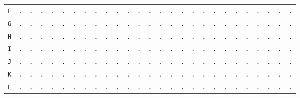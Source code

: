 \begin{figure}[H]
\begin{center}
{\begin{tabular}{c|cccccccccccccccccccccccccc}
				\texttt{F} & \texttt{.} & \texttt{.} & \texttt{.} & \texttt{.} & \texttt{.} & \texttt{.} & \texttt{.} & \texttt{.} & \texttt{.} & \texttt{.} & \texttt{.} & \texttt{.} & \texttt{.} & \texttt{.} & \texttt{.} & \texttt{.} & \texttt{.} & \texttt{.} & \texttt{.} & \texttt{.} & \texttt{.} & \texttt{.} & \texttt{.} & \texttt{.} & \texttt{.} & \texttt{.} \\
				\texttt{G} & \texttt{.} & \texttt{.} & \texttt{.} & \texttt{.} & \texttt{.} & \texttt{.} & \texttt{.} & \texttt{.} & \texttt{.} & \texttt{.} & \texttt{.} & \texttt{.} & \texttt{.} & \texttt{.} & \texttt{.} & \texttt{.} & \texttt{.} & \texttt{.} & \texttt{.} & \texttt{.} & \texttt{.} & \texttt{.} & \texttt{.} & \texttt{.} & \texttt{.} & \texttt{.} \\
				\texttt{H} & \texttt{.} & \texttt{.} & \texttt{.} & \texttt{.} & \texttt{.} & \texttt{.} & \texttt{.} & \texttt{.} & \texttt{.} & \texttt{.} & \texttt{.} & \texttt{.} & \texttt{.} & \texttt{.} & \texttt{.} & \texttt{.} & \texttt{.} & \texttt{.} & \texttt{.} & \texttt{.} & \texttt{.} & \texttt{.} & \texttt{.} & \texttt{.} & \texttt{.} & \texttt{.} \\
				\texttt{I} & \texttt{.} & \texttt{.} & \texttt{.} & \texttt{.} & \texttt{.} & \texttt{.} & \texttt{.} & \texttt{.} & \texttt{.} & \texttt{.} & \texttt{.} & \texttt{.} & \texttt{.} & \texttt{.} & \texttt{.} & \texttt{.} & \texttt{.} & \texttt{.} & \texttt{.} & \texttt{.} & \texttt{.} & \texttt{.} & \texttt{.} & \texttt{.} & \texttt{.} & \texttt{.} \\
				\texttt{J} & \texttt{.} & \texttt{.} & \texttt{.} & \texttt{.} & \texttt{.} & \texttt{.} & \texttt{.} & \texttt{.} & \texttt{.} & \texttt{.} & \texttt{.} & \texttt{.} & \texttt{.} & \texttt{.} & \texttt{.} & \texttt{.} & \texttt{.} & \texttt{.} & \texttt{.} & \texttt{.} & \texttt{.} & \texttt{.} & \texttt{.} & \texttt{.} & \texttt{.} & \texttt{.} \\
				\texttt{K} & \texttt{.} & \texttt{.} & \texttt{.} & \texttt{.} & \texttt{.} & \texttt{.} & \texttt{.} & \texttt{.} & \texttt{.} & \texttt{.} & \texttt{.} & \texttt{.} & \texttt{.} & \texttt{.} & \texttt{.} & \texttt{.} & \texttt{.} & \texttt{.} & \texttt{.} & \texttt{.} & \texttt{.} & \texttt{.} & \texttt{.} & \texttt{.} & \texttt{.} & \texttt{.} \\
				\texttt{L} & \texttt{.} & \texttt{.} & \texttt{.} & \texttt{.} & \texttt{.} & \texttt{.} & \texttt{.} & \texttt{.} & \texttt{.} & \texttt{.} & \texttt{.} & \texttt{.} & \texttt{.} & \texttt{.} & \texttt{.} & \texttt{.} & \texttt{.} & \texttt{.} & \texttt{.} & \texttt{.} & \texttt{.} & \texttt{.} & \texttt{.} & \texttt{.} & \texttt{.} & \texttt{.} \\

\end{tabular}}
\end{center}
\end{figure}
